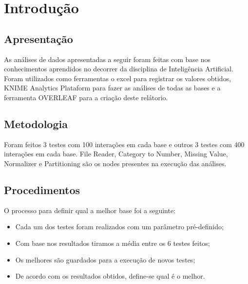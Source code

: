 \section{Introdução}
\label{sec:introducao}

\subsection{Apresentação}
As análises de dados apresentadas a seguir foram feitas com base nos conhecimentos aprendidos no decorrer da disciplina de Inteligência Artificial. Foram utilizados como ferramentas o excel para registrar os valores obtidos, KNIME Analytics Plataform para fazer as análises de todas as bases e a ferramenta OVERLEAF para a criação deste relátorio.

\subsection{Metodologia}
Foram feitos 3 testes com 100 interações em cada base e outros 3 testes com 400 interações em cada base. File Reader, Category to Number, Missing Value, Normalizer e Partitioning são os nodes presentes na execução das análises.

\subsection{Procedimentos}
O processo para definir qual a melhor base foi a seguinte:
\begin{itemize}
    \item Cada um dos testes foram realizados com um parâmetro pré-definido;
    \item Com base nos resultados tiramos a média entre os 6 testes feitos;
    \item Os melhores são guardados para a execução de novos testes;
    \item De acordo com os resultados obtidos, define-se qual é o melhor.
\end{itemize}
